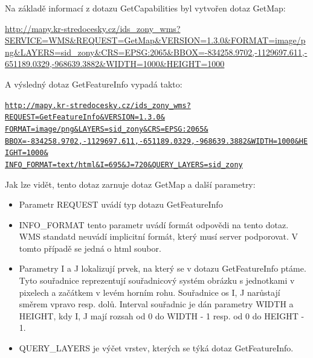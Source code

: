 \documentclass[a4paper,12pt]{article}
\begin{document}
Na základě informací z dotazu GetCapabilities byl vytvořen dotaz GetMap: 

\url{http://mapy.kr-stredocesky.cz/ids_zony_wms?SERVICE=WMS&REQUEST=GetMap&VERSION=1.3.0&FORMAT=image/png&LAYERS=sid_zony&CRS=EPSG:2065&BBOX=-834258.9702,-1129697.611,-651189.0329,-968639.3882&WIDTH=1000&HEIGHT=1000}

A výsledný dotaz GetFeatureInfo vypadá takto:
\newcommand{\StredoceskyGetFeatureInfo}{http://mapy.kr-stredocesky.cz/ids_zony_wms?REQUEST=GetFeatureInfo&VERSION=1.3.0&FORMAT=image/png&LAYERS=sid_zony&CRS=EPSG:2065&BBOX=-834258.9702,-1129697.611,-651189.0329,-968639.3882&WIDTH=1000&HEIGHT=1000&INFO_FORMAT=text/html&I=695&J=720&QUERY_LAYERS=sid_zony}
\begin{alltt}\footnotesize
\href{\StredoceskyGetFeatureInfo}{http://mapy.kr-stredocesky.cz/ids\_zony\_wms?}
\href{\StredoceskyGetFeatureInfo}{REQUEST=GetFeatureInfo\&VERSION=1.3.0\&}
\href{\StredoceskyGetFeatureInfo}{FORMAT=image/png\&LAYERS=sid\_zony\&CRS=EPSG:2065\&}
\href{\StredoceskyGetFeatureInfo}{BBOX=-834258.9702,-1129697.611,-651189.0329,-968639.3882\&WIDTH=1000\&HEIGHT=1000\&}
\href{\StredoceskyGetFeatureInfo}{INFO\_FORMAT=text/html\&I=695\&J=720\&QUERY\_LAYERS=sid\_zony}
\end{alltt}


Jak lze vidět, tento dotaz zarnuje dotaz GetMap a další parametry:
\begin{itemize}
  \item Parametr REQUEST uvádí typ dotazu GetFeatureInfo 
  \item INFO\_FORMAT tento parametr uvádí formát odpovědi na tento dotaz. WMS standatd neuvádí implicitní formát, který musí server podporovat. V tomto případě se jedná o html soubor. 
  \item Parametry I a J lokalizují prvek, na který se v dotazu GetFeatureInfo ptáme. Tyto souřadnice reprezentují souřadnicový systém obrázku s jednotkami v pixelech a začátkem v levém horním rohu. Souřadnice os I, J narůstají  
        směrem vpravo resp. dolů. Interval souřadnic je dán parametry WIDTH a HEIGHT, kdy I, J mají rozsah od 0 do WIDTH - 1 resp. od 0 do HEIGHT - 1.  
  \item QUERY\_LAYERS je výčet vrstev, kterých se týká dotaz GetFeatureInfo. 
\end{itemize}
\end{document}
